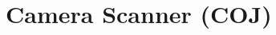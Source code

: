 \documentclass[
    headings=optiontotocandhead,%
    twoside,
    numbers=noenddot,%
    toc=flat, %
    12pt, %
    titlepage, %
    parskip=full, %
    listof=totoc, %
    listof=flat, %
    numbers=noenddot, %
    bibliography=totoc, %
    a4paper,DIV=14,
    BCOR=15mm,
]{scrbook}
\begin{document}






%





%

%

%

\chapter{Camera Scanner (COJ)}
\renewcommand{\kapitelautor}{Autor: Filip Coja}

\end{document}
